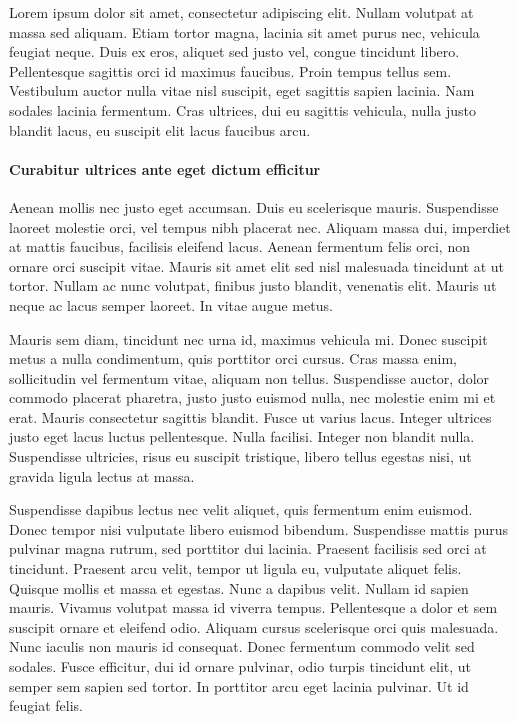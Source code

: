 Lorem ipsum dolor sit amet, consectetur adipiscing elit. Nullam volutpat at massa sed aliquam. Etiam tortor magna, lacinia sit amet purus nec, vehicula feugiat neque. Duis ex eros, aliquet sed justo vel, congue tincidunt libero. Pellentesque sagittis orci id maximus faucibus. Proin tempus tellus sem. Vestibulum auctor nulla vitae nisl suscipit, eget sagittis sapien lacinia. Nam sodales lacinia fermentum. Cras ultrices, dui eu sagittis vehicula, nulla justo blandit lacus, eu suscipit elit lacus faucibus arcu.

\paragraph{Curabitur ultrices ante eget dictum efficitur} Aenean mollis nec justo eget accumsan. Duis eu scelerisque mauris. Suspendisse laoreet molestie orci, vel tempus nibh placerat nec. Aliquam massa dui, imperdiet at mattis faucibus, facilisis eleifend lacus. Aenean fermentum felis orci, non ornare orci suscipit vitae. Mauris sit amet elit sed nisl malesuada tincidunt at ut tortor. Nullam ac nunc volutpat, finibus justo blandit, venenatis elit. Mauris ut neque ac lacus semper laoreet. In vitae augue metus.

Mauris sem diam, tincidunt nec urna id, maximus vehicula mi. Donec suscipit metus a nulla condimentum, quis porttitor orci cursus. Cras massa enim, sollicitudin vel fermentum vitae, aliquam non tellus. Suspendisse auctor, dolor commodo placerat pharetra, justo justo euismod nulla, nec molestie enim mi et erat. Mauris consectetur sagittis blandit. Fusce ut varius lacus. Integer ultrices justo eget lacus luctus pellentesque. Nulla facilisi. Integer non blandit nulla. Suspendisse ultricies, risus eu suscipit tristique, libero tellus egestas nisi, ut gravida ligula lectus at massa.

Suspendisse dapibus lectus nec velit aliquet, quis fermentum enim euismod. Donec tempor nisi vulputate libero euismod bibendum. Suspendisse mattis purus pulvinar magna rutrum, sed porttitor dui lacinia. Praesent facilisis sed orci at tincidunt. Praesent arcu velit, tempor ut ligula eu, vulputate aliquet felis. Quisque mollis et massa et egestas. Nunc a dapibus velit. Nullam id sapien mauris. Vivamus volutpat massa id viverra tempus. Pellentesque a dolor et sem suscipit ornare et eleifend odio. Aliquam cursus scelerisque orci quis malesuada. Nunc iaculis non mauris id consequat. Donec fermentum commodo velit sed sodales. Fusce efficitur, dui id ornare pulvinar, odio turpis tincidunt elit, ut semper sem sapien sed tortor. In porttitor arcu eget lacinia pulvinar. Ut id feugiat felis.

